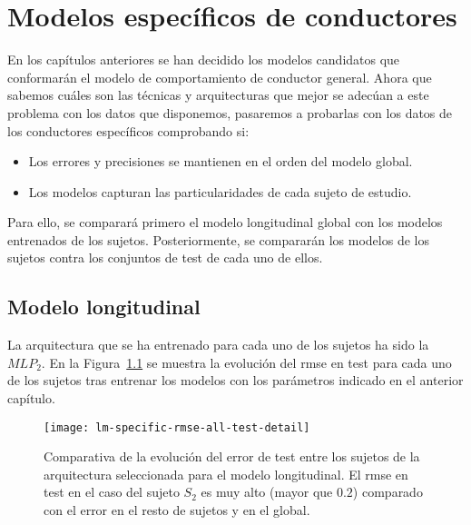 \chapter{Modelos específicos de conductores}
\label{ch:specific-models}

En los capítulos anteriores se han decidido los modelos candidatos que conformarán el modelo de comportamiento de conductor general. Ahora que sabemos cuáles son las técnicas y arquitecturas que mejor se adecúan a este problema con los datos que disponemos, pasaremos a probarlas con los datos de los conductores específicos comprobando si:

\begin{itemize}
	\item Los errores y precisiones se mantienen en el orden del modelo global.
	\item Los modelos capturan las particularidades de cada sujeto de estudio.
\end{itemize}

Para ello, se comparará primero el modelo longitudinal global con los modelos entrenados de los sujetos. Posteriormente, se compararán los modelos de los sujetos contra los conjuntos de test de cada uno de ellos.

\section{Modelo longitudinal}

La arquitectura que se ha entrenado para cada uno de los sujetos ha sido la $MLP_2$. En la Figura~\ref{fig:lm-specific-training-validation-and-test-comparison} se muestra la evolución del \Acrshort{rmse} en test para cada uno de los sujetos tras entrenar los modelos con los parámetros indicado en el anterior capítulo.

\begin{figure}
	\centering
	\texttt{[image: lm-specific-rmse-all-test-detail]}
	\caption[Comparativa de la evolución del \gls{rmse} en test para los sujetos de la arquitectura seleccionada para el modelo longitudinal]{Comparativa de la evolución del error de test entre los sujetos de la arquitectura seleccionada para el modelo longitudinal. El \gls{rmse} en test en el caso del sujeto $S_2$ es muy alto (mayor que $0.2$) comparado con el error en el resto de sujetos y en el global.}
	\label{fig:lm-specific-training-validation-and-test-comparison}
\end{figure}

